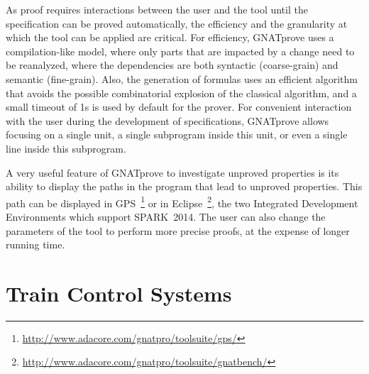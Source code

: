 \documentclass[10pt,a4paper,twocolumn]{article}
\newcommand{\DOC}{\textsc{do-178c}\xspace}
\newcommand{\gnatprove}{GNATprove\xspace}
\newcommand{\newspark}{SPARK~2014\xspace}
\begin{document}
As proof requires interactions between the user and the tool until the
specification can be proved automatically, the efficiency and the granularity
at which the tool can be applied are critical. For efficiency, \gnatprove uses
a compilation-like model, where only parts that are impacted by a change need
to be reanalyzed, where the dependencies are both syntactic (coarse-grain) and
semantic (fine-grain). Also, the generation of formulas uses an efficient
algorithm~\cite{leino:2005:ipl} that avoids the possible combinatorial
explosion of the classical algorithm, and a small timeout of 1s is used by
default for the prover. For convenient interaction with the user during the
development of specifications, \gnatprove allows focusing on a single unit, a
single subprogram inside this unit, or even a single line inside this
subprogram.

A very useful feature of \gnatprove to investigate unproved properties is its
ability to display the paths in the program that lead to unproved
properties. This path can be displayed in
GPS~\footnote{\url{http://www.adacore.com/gnatpro/toolsuite/gps/}} or in
Eclipse~\footnote{\url{http://www.adacore.com/gnatpro/toolsuite/gnatbench/}},
the two Integrated Development Environments which support \newspark. The user
can also change the parameters of the tool to perform more precise proofs, at
the expense of longer running time.



\section{Train Control Systems}
\label{sec:openETCS}
\end{document}
